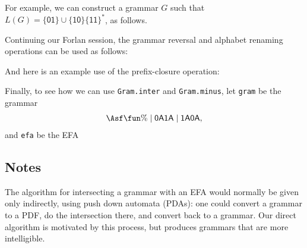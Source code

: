 For example, we can construct a grammar $G$ such that
$L(G)=\mathsf{\{01\}\cup\{10\}\{11\}^*}$, as follows.

Continuing our Forlan session, the grammar reversal and alphabet
renaming operations can be used as follows:

And here is an example use of the prefix-closure operation:


Finally, to see how we can use \texttt{Gram.inter} and
\texttt{Gram.minus}, let \texttt{gram} be the grammar
\begin{gather*}
  \Asf \fun \% \mid \mathsf{0A1A} \mid \mathsf{1A0A} ,
\end{gather*}
and \texttt{efa} be the EFA
\begin{center}
  
\end{center}


%

\subsection{Notes}

The algorithm for intersecting a grammar with an EFA would normally be given
only indirectly, using push down automata (PDAs): one could convert a grammar
to a PDF, do the intersection there, and convert back to a grammar.  Our direct
algorithm is motivated by this process, but produces grammars that are more
intelligible.

